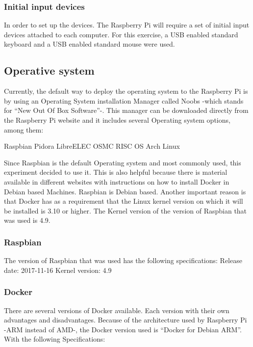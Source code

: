 \documentclass[sigconf]{acmart}
\begin{document}
	\subsubsection{Initial input devices}
	
	In order to set up the devices. The Raspberry Pi will require a set of initial input devices attached to each computer.
	For this exercise, a USB enabled standard keyboard and a USB enabled standard mouse were used.
	
	\subsection{Operative system}
	Currently, the default way to deploy the operating system to the Raspberry Pi is by using an Operating System installation Manager called Noobs -which stands for “New Out Of Box Software”-. This manager can be downloaded directly from the Raspberry Pi website and it includes several Operating system options, among them:
	
	Raspbian
	Pidora
	LibreELEC
	OSMC
	RISC OS
	Arch Linux
	
	Since Raspbian is the default Operating system and most commonly used, this experiment decided to use it. This is also helpful because there is material available in different websites with instructions on how to install Docker in Debian based Machines. Raspbian is Debian based.
	Another important reason is that Docker has as a requirement that the Linux kernel version on which it will be installed is 3.10 or higher. The Kernel version of the version of Raspbian that was used is 4.9.
	
	\subsubsection{Raspbian}
	
	The version of Raspbian that was used has the following specifications:
	Release date: 2017-11-16
	Kernel version: 4.9
	
	\subsubsection{Docker}
	
	There are several versions of Docker available. Each version with their own advantages and disadvantages. Because of the architecture used by Raspberry Pi -ARM instead of AMD-, the Docker version used is “Docker for Debian ARM”. With the following Specifications:
	
\end{document}
